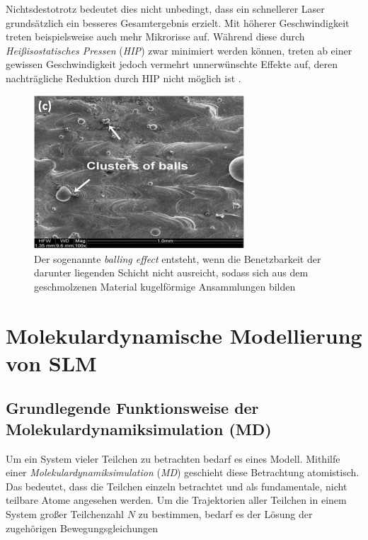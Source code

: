 		Nichtsdestotrotz bedeutet dies nicht unbedingt, dass ein schnellerer Laser grundsätzlich
		ein besseres Gesamtergebnis erzielt. Mit höherer Geschwindigkeit treten beispielsweise
		auch mehr Mikrorisse auf. Während diese durch \emph{Heißisostatisches Pressen}
		(\emph{HIP}) zwar minimiert werden können, treten ab einer gewissen Geschwindigkeit jedoch
		vermehrt unnerwünschte Effekte auf, deren nachträgliche Reduktion durch HIP nicht möglich
		ist \cite{sadali2020influence}.

		\begin{figure}[!ht]
			\centering
			\includegraphics[width=0.7\textwidth]{chapter/main/theory/img/defects/balling.png}
			\caption{Der sogenannte \emph{balling effect} entsteht, wenn die Benetzbarkeit der
			darunter liegenden Schicht nicht ausreicht, sodass sich aus dem geschmolzenen
			Material kugelförmige Ansammlungen bilden \cite{eskandarisabzi2019defect}}
			\label{fig:defects_balling}
		\end{figure}


\section{Molekulardynamische Modellierung von SLM}
	\subsection{Grundlegende Funktionsweise der Molekulardynamiksimulation (MD)}
		Um ein System vieler Teilchen zu betrachten bedarf es eines Modell. Mithilfe einer
		\emph{Molekulardynamiksimulation} (\emph{MD}) geschieht diese Betrachtung atomistisch.
		Das bedeutet, dass die Teilchen einzeln betrachtet und als fundamentale, nicht teilbare
		Atome angesehen werden. Um die Trajektorien aller Teilchen in einem System großer
		Teilchenzahl $N$ zu bestimmen, bedarf es der Lösung der zugehörigen Bewegungsgleichungen

